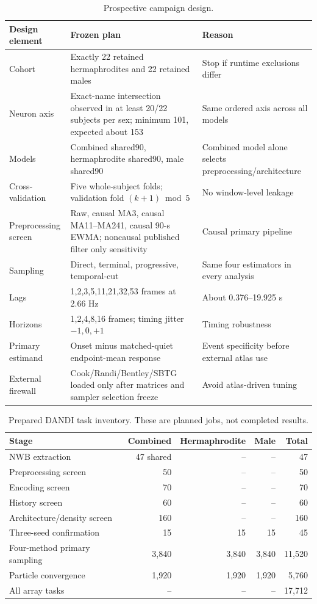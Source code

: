 \documentclass[10pt]{article}
\begin{document}
\begin{table}[H]
\centering\small
\begin{tabularx}{\linewidth}{L{3.0cm}Y Y}
\toprule Design element & Frozen plan & Reason \\
\midrule
Cohort & Exactly 22 retained hermaphrodites and 22 retained males & Stop if runtime exclusions differ \\
Neuron axis & Exact-name intersection observed in at least 20/22 subjects per sex; minimum 101, expected about 153 & Same ordered axis across all models \\
Models & Combined shared90, hermaphrodite shared90, male shared90 & Combined model alone selects preprocessing/architecture \\
Cross-validation & Five whole-subject folds; validation fold $(k+1)\bmod5$ & No window-level leakage \\
Preprocessing screen & Raw, causal MA3, causal MA11--MA241, causal 90-s EWMA; noncausal published filter only sensitivity & Causal primary pipeline \\
Sampling & Direct, terminal, progressive, temporal-cut & Same four estimators in every analysis \\
Lags & 1,2,3,5,11,21,32,53 frames at 2.66 Hz & About 0.376--19.925 s \\
Horizons & 1,2,4,8,16 frames; timing jitter $-1,0,+1$ & Timing robustness \\
Primary estimand & Onset minus matched-quiet endpoint-mean response & Event specificity before external atlas use \\
External firewall & Cook/Randi/Bentley/SBTG loaded only after matrices and sampler selection freeze & Avoid atlas-driven tuning \\
\bottomrule
\end{tabularx}
\caption{Prospective campaign design.}
\end{table}

\begin{table}[H]
\centering\small
\begin{tabular}{lrrrr}
\toprule Stage & Combined & Hermaphrodite & Male & Total \\
\midrule
NWB extraction & 47 shared & -- & -- & 47 \\
Preprocessing screen & 50 & -- & -- & 50 \\
Encoding screen & 70 & -- & -- & 70 \\
History screen & 60 & -- & -- & 60 \\
Architecture/density screen & 160 & -- & -- & 160 \\
Three-seed confirmation & 15 & 15 & 15 & 45 \\
Four-method primary sampling & 3,840 & 3,840 & 3,840 & 11,520 \\
Particle convergence & 1,920 & 1,920 & 1,920 & 5,760 \\
\midrule
All array tasks & -- & -- & -- & 17,712 \\
\bottomrule
\end{tabular}
\caption{Prepared DANDI task inventory. These are planned jobs, not completed results.}
\end{table}
\end{document}
